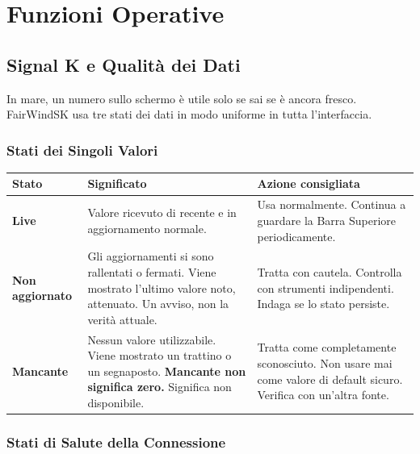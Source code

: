 \part{Funzioni Operative}

\chapter{Signal K e Qualità dei Dati}
\label{ch:qualitadati}

In mare, un numero sullo schermo è utile solo se sai se è ancora fresco.
FairWindSK usa tre stati dei dati in modo uniforme in tutta l'interfaccia.

\section{Stati dei Singoli Valori}

\begin{longtable}{L{2.4cm}L{5.2cm}L{6.1cm}}
\toprule
{}
\color{white}\sffamily\bfseries Stato &
\color{white}\sffamily\bfseries Significato &
\color{white}\sffamily\bfseries Azione consigliata \\
\midrule
\textbf{Live}         &
  Valore ricevuto di recente e in aggiornamento normale. &
  Usa normalmente. Continua a guardare la Barra Superiore periodicamente. \\
\textbf{Non aggiornato} &
  Gli aggiornamenti si sono rallentati o fermati. Viene mostrato l'ultimo valore
  noto, attenuato. Un avviso, non la verità attuale. &
  Tratta con cautela. Controlla con strumenti indipendenti.
  Indaga se lo stato persiste. \\
\textbf{Mancante}     &
  Nessun valore utilizzabile. Viene mostrato un trattino o un segnaposto.
  \textbf{Mancante non significa zero.} Significa non disponibile. &
  Tratta come completamente sconosciuto.
  Non usare mai come valore di default sicuro.
  Verifica con un'altra fonte. \\
\bottomrule
\end{longtable}

\section{Stati di Salute della Connessione}

